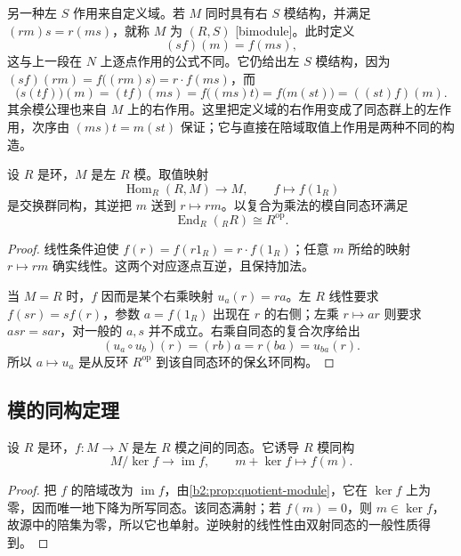 \ProseParagraphBreak
另一种左 \(S\) 作用来自定义域。若 \(M\) 同时具有右 \(S\) 模结构，并满足 \((rm)s=r(ms)\)，就称 \(M\) 为 \((R,S)\) [bimodule]。此时定义
\[
	(sf)(m)=f(ms),
\]
这与上一段在 \(N\) 上逐点作用的公式不同。它仍给出左 \(S\) 模结构，因为 \((sf)(rm)=f\bigl((rm)s\bigr)=r\cdot f(ms)\)，而
\[
	\bigl(s(tf)\bigr)(m)=(tf)(ms)=f\bigl((ms)t\bigr)=f\bigl(m(st)\bigr)=((st)f)(m).
\]
其余模公理也来自 \(M\) 上的右作用。这里把定义域的右作用变成了同态群上的左作用，次序由 \((ms)t=m(st)\) 保证；它与直接在陪域取值上作用是两种不同的构造。

\begin{proposition}\label{b2:prop:regular-hom-endomorphism}
	设 \(R\) 是环，\(M\) 是左 \(R\) 模。取值映射
	\[
		\operatorname{Hom}_R(R,M)\longrightarrow M,\qquad f\longmapsto f(1_R)
	\]
	是交换群同构，其逆把 \(m\) 送到 \(r\mapsto rm\)。以复合为乘法的模自同态环满足
	\[
		\operatorname{End}_R({}_RR)\cong R^{\mathrm{op}}.
	\]
\end{proposition}
\begin{proof}
	线性条件迫使 \(f(r)=f(r1_R)=r\cdot f(1_R)\)；任意 \(m\) 所给的映射 \(r\mapsto rm\) 确实线性。这两个对应逐点互逆，且保持加法。

	当 \(M=R\) 时，\(f\) 因而是某个右乘映射 \(u_a(r)=ra\)。左 \(R\) 线性要求 \(f(sr)=sf(r)\)，参数 \(a=f(1_R)\) 出现在 \(r\) 的右侧；左乘 \(r\mapsto ar\) 则要求 \(asr=sar\)，对一般的 \(a,s\) 并不成立。右乘自同态的复合次序给出
	\[
		(u_a\circ u_b)(r)=(rb)a=r(ba)=u_{ba}(r).
	\]
	所以 \(a\mapsto u_a\) 是从反环 \(R^{\mathrm{op}}\) 到该自同态环的保幺环同构。
\end{proof}

\subsection{模的同构定理}
\label{b2:subsec:0202:03}

\begin{theorem}[第一同构]\label{b2:thm:module-first-isomorphism}
	设 \(R\) 是环，\(f:M\to N\) 是左 \(R\) 模之间的同态。它诱导 \(R\) 模同构
	\[
		M/\ker f\longrightarrow\operatorname{im}f,\qquad m+\ker f\longmapsto f(m).
	\]
\end{theorem}
\begin{proof}
	把 \(f\) 的陪域改为 \(\operatorname{im}f\)，由\cref{b2:prop:quotient-module}，它在 \(\ker f\) 上为零，因而唯一地下降为所写同态。该同态满射；若 \(f(m)=0\)，则 \(m\in\ker f\)，故源中的陪集为零，所以它也单射。逆映射的线性性由双射同态的一般性质得到。
\end{proof}

